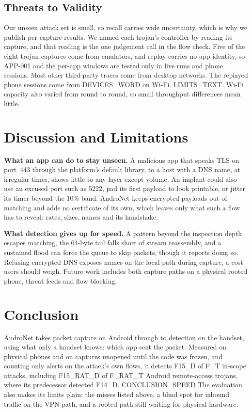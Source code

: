 \documentclass[runningheads]{llncs}
\begin{document}
\subsection{Threats to Validity}

Our unseen attack set is small, so recall carries wide uncertainty, which is why we publish per-capture results. We named each trojan's controller by reading its capture, and that reading is the one judgement call in the flow check. Five of the eight trojan captures come from emulators, and replay carries no app identity, so APP-001 and the per-app windows are tested only in live runs and phone sessions. Most other third-party traces come from desktop networks. The replayed phone sessions come from {{DEVICES_WORD}} on Wi-Fi. {{LIMITS_TEXT}}. Wi-Fi capacity also varied from round to round, so small throughput differences mean little.

\section{Discussion and Limitations}\label{sec:discussion}

\textbf{What an app can do to stay unseen.} A malicious app that speaks TLS on port~443 through the platform's default library, to a host with a DNS name, at irregular times, shows little to any layer except volume. An implant could also use an excused port such as 5222, pad its first payload to look printable, or jitter its timer beyond the 10\% band. AndroNet keeps encrypted payloads out of matching and adds no certificate of its own, which leaves only what such a flow has to reveal: rates, sizes, names and its handshake.

\textbf{What detection gives up for speed.} A pattern beyond the inspection depth escapes matching, the 64-byte tail falls short of stream reassembly, and a sustained flood can force the queue to skip packets, though it reports doing so. Refusing encrypted DNS exposes names on the local path during capture, a cost users should weigh. Future work includes both capture paths on a physical rooted phone, threat feeds and flow blocking.

\section{Conclusion}\label{sec:conclusion}

AndroNet takes packet capture on Android through to detection on the handset, using what only a handset knows: which app sent the packet. Measured on physical phones and on captures unopened until the code was frozen, and counting only alerts on the attack's own flows, it detects {{F15_D}} of {{F_T}} in-scope attacks, including {{F15_RAT_D}} of {{F_RAT_T}} Android remote-access trojans, where its predecessor detected {{F14_D}}. {{CONCLUSION_SPEED}} The evaluation also makes its limits plain: the misses listed above, a blind spot for inbound traffic on the VPN path, and a rooted path still waiting for physical hardware.
\end{document}
